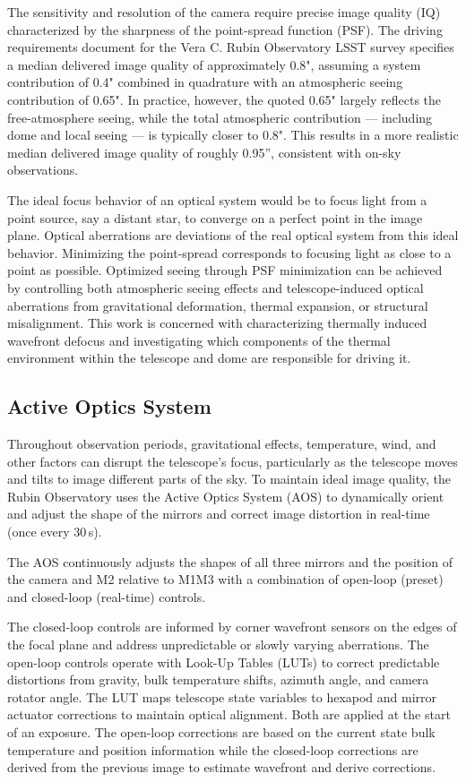 \documentclass[SE,authoryear,toc]{lsstdoc}
\begin{document}
The sensitivity and resolution of the camera require precise image quality (IQ) characterized by the sharpness of the point-spread function (PSF). The driving requirements document for the Vera C. Rubin Observatory LSST survey \citep{Ivezic2019} specifies a median delivered image quality of approximately 0.8", assuming a system contribution of 0.4" combined in quadrature with an atmospheric seeing contribution of 0.65". In practice, however, the quoted 0.65" largely reflects the free-atmosphere seeing, while the total atmospheric contribution — including dome and local seeing — is typically closer to 0.8". This results in a more realistic median delivered image quality of roughly 0.95'', consistent with on-sky observations.

The ideal focus behavior of an optical system would be to focus light from a point source, say a distant star, to converge on a perfect point in the image plane. Optical aberrations are deviations of the real optical system from this ideal behavior. Minimizing the point-spread corresponds to focusing light as close to a point as possible. Optimized seeing through PSF minimization can be achieved by controlling both atmospheric seeing effects and telescope-induced optical aberrations from gravitational deformation, thermal expansion, or structural misalignment. This work is concerned with characterizing thermally induced wavefront defocus and investigating which components of the thermal environment within the telescope and dome are responsible for driving it. 

\subsection{Active Optics System}
\label{subsec:AOS}

Throughout observation periods, gravitational effects, temperature, wind, and other factors can disrupt the telescope's focus, particularly as the telescope moves and tilts to image different parts of the sky. To maintain ideal image quality, the Rubin Observatory uses the Active Optics System (AOS) to dynamically orient and adjust the shape of the mirrors and correct image distortion in real-time (once every 30\,s).

The AOS continuously adjusts the shapes of all three mirrors and the position of the camera and M2 relative to M1M3 with a combination of open-loop (preset) and closed-loop (real-time) controls. 

The closed-loop controls are informed by corner wavefront sensors on the edges of the focal plane and address unpredictable or slowly varying aberrations. The open-loop controls operate with Look-Up Tables (LUTs) to correct predictable distortions from gravity, bulk temperature shifts, azimuth angle, and camera rotator angle. The LUT maps telescope state variables to hexapod and mirror actuator corrections to maintain optical alignment. Both are applied at the start of an exposure. The open-loop corrections are based on the current state bulk temperature and position information while the closed-loop corrections are derived from the previous image to estimate wavefront and derive corrections.
\end{document}
